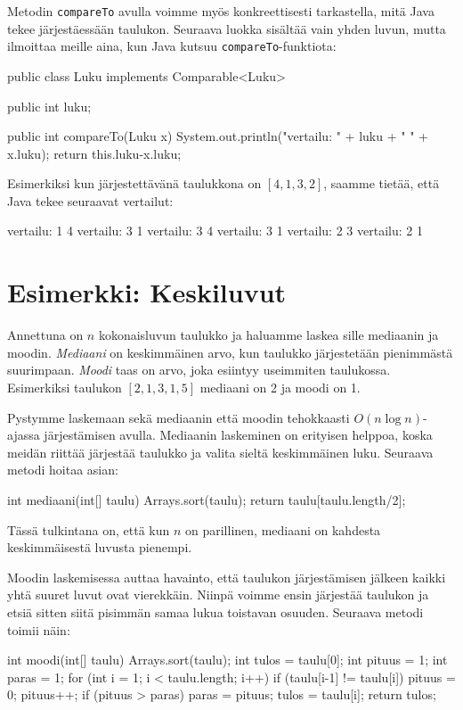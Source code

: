 Metodin \texttt{compareTo} avulla voimme myös konkreettisesti
tarkastella, mitä Java tekee järjestäessään taulukon.
Seuraava luokka sisältää vain yhden luvun,
mutta ilmoittaa meille aina, kun Java kutsuu
\texttt{compareTo}-funktiota:

\begin{code}
public class Luku implements Comparable<Luku> {
    public int luku;

    public int compareTo(Luku x) {
        System.out.println("vertailu: " + luku + " " + x.luku);
        return this.luku-x.luku;
    }
}
\end{code}

Esimerkiksi kun järjestettävänä taulukkona on $[4,1,3,2]$,
saamme tietää, että Java tekee seuraavat vertailut:

\begin{code}
vertailu: 1 4
vertailu: 3 1
vertailu: 3 4
vertailu: 3 1
vertailu: 2 3
vertailu: 2 1
\end{code}

\section{Esimerkki: Keskiluvut}

Annettuna on $n$ kokonaisluvun taulukko ja haluamme
laskea sille mediaanin ja moodin.
\emph{Mediaani} on keskimmäinen arvo, kun taulukko järjestetään
pienimmästä suurimpaan.
\emph{Moodi} taas on arvo, joka esiintyy useimmiten taulukossa.
Esimerkiksi taulukon $[2,1,3,1,5]$ mediaani on 2 ja moodi on 1.

Pystymme laskemaan sekä mediaanin että moodin tehokkaasti
$O(n \log n)$-ajassa järjestämisen avulla.
Mediaanin laskeminen on erityisen helppoa,
koska meidän riittää järjestää taulukko ja valita
sieltä keskimmäinen luku. Seuraava metodi hoitaa asian:

\begin{code}
int mediaani(int[] taulu) {
    Arrays.sort(taulu);
    return taulu[taulu.length/2];
}
\end{code}

Tässä tulkintana on, että kun $n$ on parillinen, mediaani
on kahdesta keskimmäisestä luvusta pienempi.

Moodin laskemisessa auttaa havainto, että taulukon järjestämisen
jälkeen kaikki yhtä suuret luvut ovat vierekkäin.
Niinpä voimme ensin järjestää taulukon ja etsiä sitten siitä
pisimmän samaa lukua toistavan osuuden.
Seuraava metodi toimii näin:

\begin{code}
int moodi(int[] taulu) {
    Arrays.sort(taulu);
    int tulos = taulu[0];
    int pituus = 1;
    int paras = 1;
    for (int i = 1; i < taulu.length; i++) {
        if (taulu[i-1] != taulu[i]) pituus = 0;
        pituus++;
        if (pituus > paras) {
            paras = pituus;
            tulos = taulu[i];
        }
    }
    return tulos;
}
\end{code}

